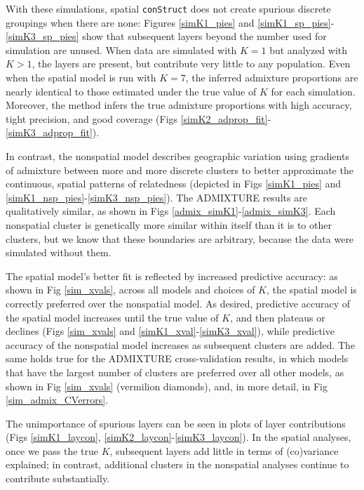 \documentclass[10pt,letterpaper]{article}
\begin{document}
With these simulations,
spatial \texttt{conStruct} does not create spurious discrete groupings when there are none:
Figures \ref{simK1_pies} and \ref{simK1_sp_pies}-\ref{simK3_sp_pies} 
show that subsequent layers beyond the number used for simulation are unused.
When data are simulated with $K=1$ but analyzed with $K>1$, 
the layers are present, but contribute very little to any population.
Even when the spatial model is run with $K=7$, 
the inferred admixture proportions are nearly identical to 
those estimated under the true value of $K$ for each simulation.
Moreover, the method infers the true admixture proportions with high accuracy, tight precision, and good coverage 
(Figs \ref{simK2_adprop_fit}-\ref{simK3_adprop_fit}).

In contrast, the nonspatial model describes geographic variation
using gradients of admixture between more and more discrete clusters
to better approximate the continuous, spatial patterns of relatedness
(depicted in Figs \ref{simK1_pies} and \ref{simK1_nsp_pies}-\ref{simK3_nsp_pies}).
The ADMIXTURE results are qualitatively similar, as shown in Figs \ref{admix_simK1}-\ref{admix_simK3}.
Each nonspatial cluster is genetically more similar within itself
than it is to other clusters,
but we know that these boundaries are arbitrary,
because the data were simulated without them.

The spatial model's better fit is reflected by increased predictive accuracy:
as shown in Fig \ref{sim_xvals},
across all models and choices of $K$, the spatial model is correctly preferred over the nonspatial model.
As desired, predictive accuracy of the spatial model increases until the true value of $K$,
and then plateaus or declines
(Figs \ref{sim_xvals} and \ref{simK1_xval}-\ref{simK3_xval}),
while predictive accuracy of the nonspatial model increases as subsequent clusters are added.
The same holds true for the ADMIXTURE cross-validation results,
in which models that have the largest number of clusters are preferred over all other models,
as shown in Fig \ref{sim_xvals} (vermilion diamonds),
and, in more detail, in Fig \ref{sim_admix_CVerrors}.

The unimportance of spurious layers can be seen in plots of layer contributions
(Figs \ref{simK1_laycon}, \ref{simK2_laycon}-\ref{simK3_laycon}).
In the spatial analyses, once we pass the true $K$, 
subsequent layers add little in terms of (co)variance explained; 
in contrast, additional clusters in the nonspatial analyses continue to contribute substantially.
\end{document}
